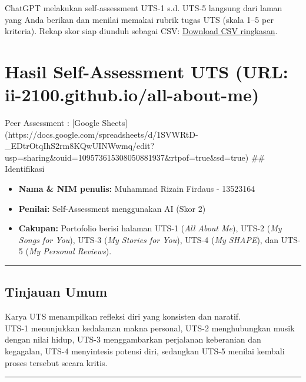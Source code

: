 \documentclass[
  letterpaper,
  DIV=11,
  numbers=noendperiod]{scrreprt}
\providecommand{\tightlist}{%
  \setlength{\itemsep}{0pt}\setlength{\parskip}{0pt}}
\begin{document}
ChatGPT melakukan self-assessment UTS-1 s.d. UTS-5 langsung dari laman
yang Anda berikan dan menilai memakai rubrik tugas UTS (skala 1--5 per
kriteria). Rekap skor siap diunduh sebagai CSV:
\href{sandbox:/mnt/data/UTS_self_assessment.csv}{Download CSV
ringkasan}.


\chapter{Hasil Self-Assessment UTS (URL:
ii-2100.github.io/all-about-me)}\label{hasil-self-assessment-uts-url-ii-2100.github.ioall-about-me}

Peer Assessment : {[}Google Sheets{]}
(https://docs.google.com/spreadsheets/d/1SVWRtD-\_EDtrOtqIhS2rm8KQwUINWwmq/edit?usp=sharing\&ouid=109573615308050881937\&rtpof=true\&sd=true)
\#\# Identifikasi

\begin{itemize}
\tightlist
\item
  \textbf{Nama \& NIM penulis:} Muhammad Rizain Firdaus - 13523164\\
\item
  \textbf{Penilai:} Self-Assessment menggunakan AI (Skor 2)\\
\item
  \textbf{Cakupan:} Portofolio berisi halaman UTS-1 (\emph{All About
  Me}), UTS-2 (\emph{My Songs for You}), UTS-3 (\emph{My Stories for
  You}), UTS-4 (\emph{My SHAPE}), dan UTS-5 (\emph{My Personal
  Reviews}).
\end{itemize}

\begin{center}\rule{0.5\linewidth}{0.5pt}\end{center}

\section{Tinjauan Umum}\label{tinjauan-umum}

Karya UTS menampilkan refleksi diri yang konsisten dan naratif.\\
UTS-1 menunjukkan kedalaman makna personal, UTS-2 menghubungkan musik
dengan nilai hidup, UTS-3 menggambarkan perjalanan keberanian dan
kegagalan, UTS-4 menyintesis potensi diri, sedangkan UTS-5 menilai
kembali proses tersebut secara kritis.

\begin{center}\rule{0.5\linewidth}{0.5pt}\end{center}
\end{document}

